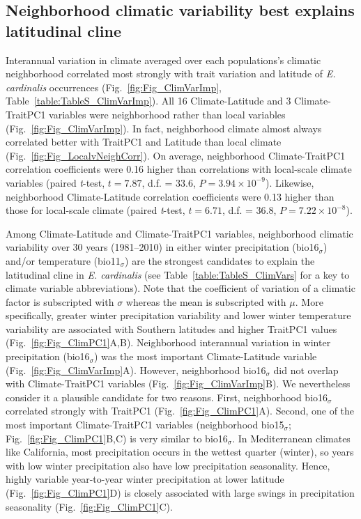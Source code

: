 \documentclass[11pt, oneside]{article}
\begin{document}
\subsection*{Neighborhood climatic variability best explains latitudinal cline}

Interannual variation in climate averaged over each populations's climatic neighborhood correlated most strongly with trait variation and latitude of \textit{E. cardinalis} occurrences (Fig.~\ref{fig:Fig_ClimVarImp}, Table~\ref{table:TableS_ClimVarImp}). All 16 Climate-Latitude and 3 Climate-TraitPC1 variables were neighborhood rather than local variables (Fig.~\ref{fig:Fig_ClimVarImp}). In fact, neighborhood climate almost always correlated better with TraitPC1 and Latitude than local climate (Fig.~\ref{fig:Fig_LocalvNeighCorr}). On average, neighborhood Climate-TraitPC1 correlation coefficients were 0.16 higher than correlations with local-scale climate variables (paired \textit{t}-test, $t = 7.87$, d.f. = 33.6, $P = 3.94 \times 10 ^ {-9}$). Likewise, neighborhood Climate-Latitude correlation coefficients were 0.13 higher than those for local-scale climate (paired \textit{t}-test, $t = 6.71$, d.f. = 36.8, $P = 7.22 \times 10 ^ {-8}$). 

Among Climate-Latitude and Climate-TraitPC1 variables, neighborhood climatic variability over 30 years (1981--2010) in either winter precipitation (bio16$_\sigma$) and/or temperature (bio11$_\sigma$) are the strongest candidates to explain the latitudinal cline in \textit{E. cardinalis} (see Table~\ref{table:TableS_ClimVars} for a key to climate variable abbreviations). Note that the coefficient of variation of a climatic factor is subscripted with $\sigma$ whereas the mean is subscripted with $\mu$. More specifically, greater winter precipitation variability and lower winter temperature variability are associated with Southern latitudes and higher TraitPC1 values (Fig.~\ref{fig:Fig_ClimPC1}A,B). Neighborhood interannual variation in winter precipitation (bio16$_\sigma$) was the most important Climate-Latitude variable (Fig.~\ref{fig:Fig_ClimVarImp}A). However, neighborhood bio16$_\sigma$ did not overlap with Climate-TraitPC1 variables (Fig.~\ref{fig:Fig_ClimVarImp}B). We nevertheless consider it a plausible candidate for two reasons. First, neighborhood bio16$_\sigma$ correlated strongly with TraitPC1 (Fig.~\ref{fig:Fig_ClimPC1}A). Second, one of the most important Climate-TraitPC1 variables (neighborhood bio15$_\sigma$; Fig.~\ref{fig:Fig_ClimPC1}B,C) is very similar to bio16$_\sigma$. In Mediterranean climates like California, most precipitation occurs in the wettest quarter (winter), so years with low winter precipitation also have low precipitation seasonality. Hence, highly variable year-to-year winter precipitation at lower latitude (Fig.~\ref{fig:Fig_ClimPC1}D) is closely associated with large swings in precipitation seasonality (Fig.~\ref{fig:Fig_ClimPC1}C). 
\end{document}

